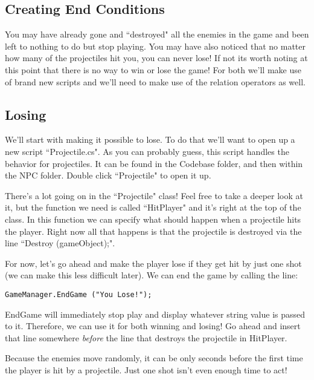 \documentclass{article}
\begin{document}
\subsection{Creating End Conditions}

You may have already gone and ``destroyed" all the enemies in the game and been left to nothing to do but stop playing. You may have also noticed that no matter how many of the projectiles hit you, you can never lose! If not its worth noting at this point that there is no way to win or lose the game! For both we'll make use of brand new scripts and we'll need to make use of the relation operators as well. 

\subsection{Losing}
We'll start with making it possible to lose. To do that we'll want to open up a new script ``Projectile.cs". As you can probably guess, this script handles the behavior for projectiles. It can be found in the Codebase folder, and then within the NPC folder. Double click ``Projectile" to open it up. 

There's a lot going on in the ``Projectile" class! Feel free to take a deeper look at it, but the function we need is called ``HitPlayer" and it's right at the top of the class. In this function we can specify what should happen when a projectile hits the player. Right now all that happens is that the projectile is destroyed via the line ``Destroy (gameObject);". 

For now, let's go ahead and make the player lose if they get hit by just one shot (we can make this less difficult later). We can end the game by calling the line:

\lstset{style=sharpc}
\begin{lstlisting}
GameManager.EndGame ("You Lose!");
\end{lstlisting}

EndGame will immediately stop play and display whatever string value is passed to it. Therefore, we can use it for both winning and losing! Go ahead and insert that line somewhere \textit{before} the line that destroys the projectile in HitPlayer. 

\noindent{}

Because the enemies move randomly, it can be only seconds before the first time the player is hit by a projectile. Just one shot isn't even enough time to act! 
\end{document}
